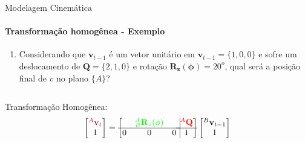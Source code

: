 \documentclass{beamer}
\begin{document}
\begin{frame}{Modelagem Cinemática}
    \framesubtitle{Transformação homogênea - Exemplo}
    \begin{enumerate}
        \item Considerando que $\mathbf{v}_{t-1}$ é um vetor unitário em $\mathbf{v}_{t-1}=\{1,0,0\}$ e sofre um deslocamento de $\mathbf{Q}=\{2,1,0\}$ e rotação $\mathbf{R_z(\phi)}=20^o$, qual será a posição final de $v$ no plano $\{A\}$?
    \end{enumerate}
    \begin{columns}
        \begin{column}[c]{0.5\textwidth}
            
        \end{column}
        \begin{column}[c]{0.5\textwidth}
            
        \end{column}
    \end{columns}
    Transformação Homogênea:
    \begin{equation*}
        \begin{bmatrix}
            \color{purple}{{}^A \mathbf{v}_{t}} \\ 1
        \end{bmatrix}
        =
        \left[
            \begin{matrix}
                  & \color{green}{{}_B^A\mathbf{R}_z(\phi)} &   \\ \hline
                0 & 0                                       & 0 \\
            \end{matrix} \right.
            \left.
            \vline
            \begin{matrix}
                \color{red}{{}^A\mathbf{Q}} \\ \hline
                1
            \end{matrix} \right]
        \begin{bmatrix}
            {}^B \mathbf{v}_{t-1} \\
            1
        \end{bmatrix}
    \end{equation*}
\end{frame}
\end{document}
